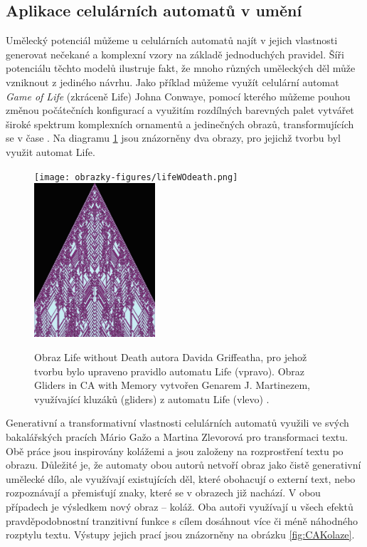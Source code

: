 \subsection*{Aplikace celulárních automatů v umění}
Umělecký potenciál můžeme u celulárních automatů najít v jejich vlastnosti generovat nečekané a komplexní vzory na základě jednoduchých pravidel. Šíři potenciálu těchto modelů ilustruje fakt, že mnoho různých uměleckých děl může vzniknout z jediného návrhu. Jako příklad můžeme využít celulární automat \emph{Game of Life} (zkráceně Life) Johna Conwaye, pomocí kterého můžeme pouhou změnou počátečních konfigurací a využitím rozdílných barevných palet vytvářet široké spektrum komplexních ornamentů a jedinečných obrazů, transformujících se v čase \cite{CAArt}. Na diagramu \ref{fig:caUmeni} jsou znázorněny dva obrazy, pro jejichž tvorbu byl využit automat Life.

\begin{figure}[H]
    \centering
    \texttt{[image: obrazky-figures/lifeWOdeath.png]}
    \hspace{0.1\textwidth}
    \includegraphics[width=0.4\textwidth]{obrazky-figures/caGliders.png}
    \caption{Obraz Life without Death autora Davida Griffeatha, pro jehož tvorbu bylo upraveno pravidlo automatu Life (vpravo). Obraz Gliders in CA with Memory vytvořen Genarem J. Martinezem, využívající kluzáků (gliders) z automatu Life (vlevo) \cite{CAArt}.}
    \label{fig:caUmeni}
\end{figure}

Generativní a transformativní vlastnosti celulárních automatů využili ve svých bakalářských pracích Mário Gažo \cite{GazoBak} a Martina Zlevorová \cite{ZlevorovaBak} pro transformaci textu. Obě práce jsou inspirovány kolážemi a jsou založeny na rozprostření textu po obrazu. Důležité je, že automaty obou autorů netvoří obraz jako čistě generativní umělecké dílo, ale využívají existujících děl, které obohacují o externí text, nebo rozpoznávají a přemisťují znaky, které se v obrazech již nachází. V obou případech je výsledkem nový obraz -- koláž. Oba autoři využívají u všech efektů pravděpodobnostní tranzitivní funkce s cílem dosáhnout více či méně náhodného rozptylu textu. Výstupy jejich prací jsou znázorněny na obrázku \ref{fig:CAKolaze}.

